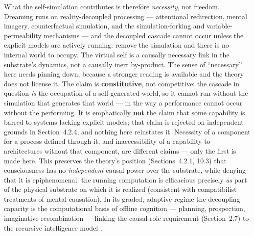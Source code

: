 \documentclass[12pt]{article}
\begin{document}
{What the self-simulation contributes is therefore \emph{necessity}, not freedom. Dreaming runs on reality-decoupled processing --- attentional redirection, mental imagery, counterfactual simulation, and the simulation-forking and variable-permeability mechanisms --- and the decoupled cascade cannot occur unless the explicit models are actively running: remove the simulation and there is no internal world to occupy. The virtual self is a causally necessary link in the substrate's dynamics, not a causally inert by-product. The sense of ``necessary'' here needs pinning down, because a stronger reading is available and the theory does not license it. The claim is \textbf{constitutive}, not competitive: the cascade in question \emph{is} the occupation of a self-generated world, so it cannot run without the simulation that generates that world --- in the way a performance cannot occur without the performing. It is emphatically \textbf{not} the claim that some capability is barred to systems lacking explicit models; that claim is rejected on independent grounds in Section~4.2.4, and nothing here reinstates it. Necessity of a component for a process defined through it, and inaccessibility of a capability to architectures without that component, are different claims --- only the first is made here. This preserves the theory's position (Sections~4.2.1, 10.3) that consciousness has no \emph{independent} causal power over the substrate, while denying that it is epiphenomenal: the running computation is efficacious precisely \emph{as} part of the physical substrate on which it is realized (consistent with compatibilist treatments of mental causation). In its graded, adaptive regime the decoupling capacity is the computational basis of offline cognition --- planning, prospection, imaginative recombination --- linking the causal-role requirement (Section~2.7) to the recursive intelligence model \citep{Gruber2026a}.

}
\end{document}
